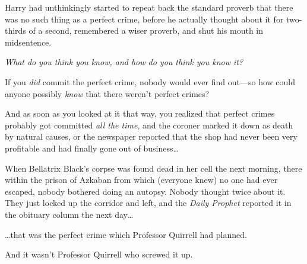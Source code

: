 Harry had unthinkingly started to repeat back the standard proverb that there
was no such thing as a perfect crime, before he actually thought about it for
two-thirds of a second, remembered a wiser proverb, and shut his mouth in
midsentence.

\emph{What do you think you know, and how do you think you know it?}

If you \emph{did} commit the perfect crime, nobody would ever find out—so how
could anyone possibly \emph{know} that there weren’t perfect crimes?

And as soon as you looked at it that way, you realized that perfect crimes
probably got committed \emph{all the time}, and the coroner marked it down as
death by natural causes, or the newspaper reported that the shop had never been
very profitable and had finally gone out of business…

When Bellatrix Black’s corpse was found dead in her cell the next morning,
there within the prison of Azkaban from which (everyone knew) no one had ever
escaped, nobody bothered doing an autopsy. Nobody thought twice about it. They
just locked up the corridor and left, and the \emph{Daily Prophet} reported it
in the obituary column the next day…

…that was the perfect crime which Professor Quirrell had planned.

And it wasn’t Professor Quirrell who screwed it up.
